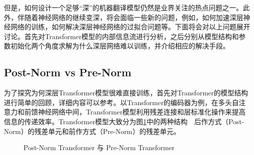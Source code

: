 \parinterval 但是，如何设计一个足够“深”的机器翻译模型仍然是业界关注的热点问题之一。此外，伴随着神经网络的继续变深，将会面临一些新的问题，例如，如何加速深层神经网络的训练，如何解决深层神经网络的过拟合问题等。下面将会对以上问题展开讨论。首先对Transformer模型的内部信息流进行分析，之后分别从模型结构和参数初始化两个角度求解为什么深层网络难以训练，并介绍相应的解决手段。


\subsection{Post-Norm vs Pre-Norm}
\label{sec:post-pre-norm}

\parinterval 为了探究为何深层Transformer模型很难直接训练，首先对Transformer的模型结构进行简单的回顾，详细内容可以参考{\chaptertwelve}。以Transformer的编码器为例，在多头自注意力和前馈神经网络中间，Transformer模型利用残差连接和层标准化操作来提高信息的传递效率。Transformer模型大致分为图\ref{fig:15-9}中的两种结构\ \dash \ 后作方式（Post-Norm）的残差单元和前作方式（Pre-Norm）的残差单元。

\begin{figure}[htp]
\centering

\caption{Post-Norm Transformer 与 Pre-Norm Transformer}
\label{fig:15-9}
\end{figure}

